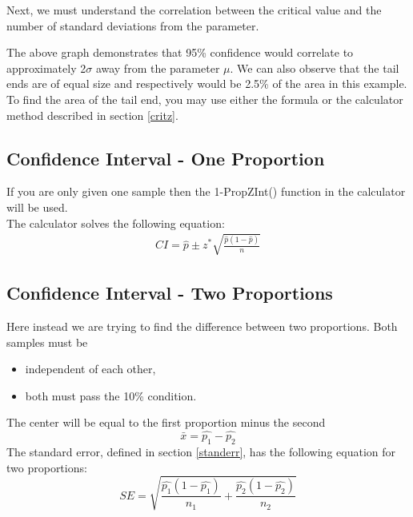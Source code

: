 \documentclass{article}
\theoremstyle{definition}
\theoremstyle{remark}
\begin{document}
Next, we must understand the correlation between the critical value and the number of standard deviations from the parameter. \\

\begin{figure}[!h]
\centering
\normaldist
\end{figure}

The above graph demonstrates that 95\% confidence would correlate to approximately 2$\sigma$ away from the parameter $\mu$.
We can also observe that the tail ends are of equal size and respectively would be 2.5\% of the area in this example. 
To find the area of the tail end, you may use either the formula or the calculator method described in section \ref{critz}.

\subsection{Confidence Interval - One Proportion}

If you are only given one sample then the 1-PropZInt() function in the calculator will be used. \\
The calculator solves the following equation: 
\begin{equation}
  \begin{aligned}
    CI = \hat{p} \pm z^{*} \sqrt{\frac{\hat{p}(1 - \hat{p})}{n}}
  \end{aligned}
\end{equation}

\subsection{Confidence Interval - Two Proportions}

Here instead we are trying to find the difference between two proportions.
Both samples must be 
\begin{itemize}
  \item independent of each other,
  \item both must pass the 10\% condition.
\end{itemize}
The center will be equal to the first proportion minus the second
\begin{equation}
  \bar{x} = \hat{p_1} - \hat{p_2}
\end{equation}
The standard error, defined in section \ref{standerr}, has the following equation for two proportions:
\begin{equation}
  SE = \sqrt{\frac{\hat{p_1}(1 - \hat{p_1})}{n_1}+\frac{\hat{p_2}(1 - \hat{p_2})}{n_2}}
\end{equation}
\end{document}
